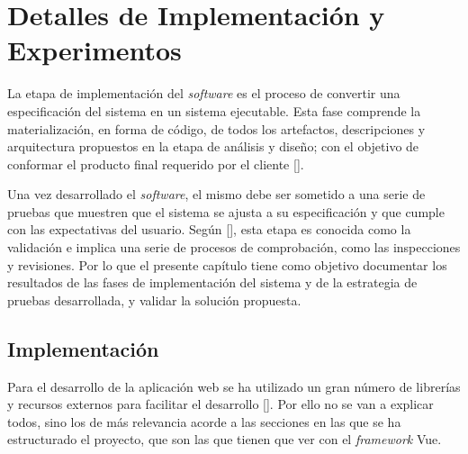 \chapter{Detalles de Implementación y Experimentos}\label{chapter:implementation}
La etapa de implementación del \textit{software} es el proceso de convertir una especificación del sistema en un sistema ejecutable. Esta fase comprende la materialización, en forma de código, de todos los artefactos, descripciones y arquitectura propuestos en la etapa de análisis y diseño; con el objetivo de conformar el producto final requerido por el cliente [\cite{91}].

Una vez desarrollado el \textit{software}, el mismo debe ser sometido a una serie de pruebas que muestren que el sistema se ajusta a su especificación y que cumple con las expectativas del usuario. Según [\cite{91}], esta etapa es conocida como la validación e implica una serie de procesos de comprobación, como las inspecciones y revisiones. Por lo que el presente capítulo tiene como objetivo documentar los resultados de las fases de implementación del sistema y de la estrategia de pruebas desarrollada, y validar la solución propuesta.


\section{Implementación}
Para el desarrollo de la aplicación web se ha utilizado un gran número de librerías y recursos externos para facilitar el desarrollo [\cite{47}]. Por ello no se van a explicar todos, sino los de más relevancia acorde a las secciones en las que se ha estructurado el proyecto, que son las que tienen que ver con el \textit{framework} Vue.


